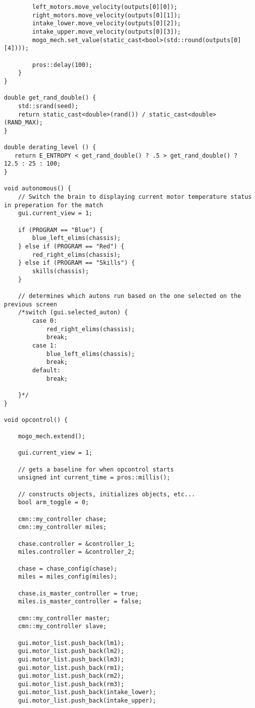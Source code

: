 \begin{verbatim}
        left_motors.move_velocity(outputs[0][0]);
        right_motors.move_velocity(outputs[0][1]);
        intake_lower.move_velocity(outputs[0][2]);
        intake_upper.move_velocity(outputs[0][3]);
        mogo_mech.set_value(static_cast<bool>(std::round(outputs[0][4])));

        pros::delay(100);
    }
}

double get_rand_double() {
    std::srand(seed);
    return static_cast<double>(rand()) / static_cast<double>(RAND_MAX);
}

double derating_level () {
   return E_ENTROPY < get_rand_double() ? .5 > get_rand_double() ? 12.5 : 25 : 100;
}

void autonomous() {
    // Switch the brain to displaying current motor temperature status in preperation for the match
    gui.current_view = 1;
    
    if (PROGRAM == "Blue") {
        blue_left_elims(chassis);
    } else if (PROGRAM == "Red") {
        red_right_elims(chassis);
    } else if (PROGRAM == "Skills") {
        skills(chassis);
    }

    // determines which autons run based on the one selected on the previous screen
    /*switch (gui.selected_auton) {
        case 0:
            red_right_elims(chassis);
            break;
        case 1:
            blue_left_elims(chassis);
            break;
        default:
            break;
        
    }*/
}

void opcontrol() {

    mogo_mech.extend();

    gui.current_view = 1;

    // gets a baseline for when opcontrol starts
    unsigned int current_time = pros::millis();

    // constructs objects, initializes objects, etc...
    bool arm_toggle = 0;

    cmn::my_controller chase;
    cmn::my_controller miles;

    chase.controller = &controller_1;
    miles.controller = &controller_2;

    chase = chase_config(chase);
    miles = miles_config(miles);

    chase.is_master_controller = true;
    miles.is_master_controller = false;

    cmn::my_controller master;
    cmn::my_controller slave;

    gui.motor_list.push_back(lm1);
    gui.motor_list.push_back(lm2);
    gui.motor_list.push_back(lm3);
    gui.motor_list.push_back(rm1);
    gui.motor_list.push_back(rm2);
    gui.motor_list.push_back(rm3);
    gui.motor_list.push_back(intake_lower);
    gui.motor_list.push_back(intake_upper);


\end{verbatim}
